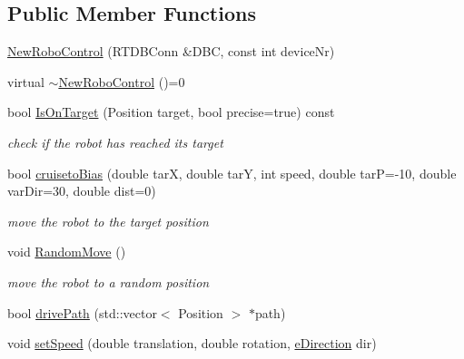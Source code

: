 \begin{DoxyCompactItemize}
RD}, 
\hyperlink{classNewRoboControl_a077fa253b827c190e82c1ce1e4c8d18faa55a679c9e8fbc7400c88ce3cab09c48}{BACKWARD}
 \}
\begin{DoxyCompactList}\small\item\em Enumeration for the driving directions. \item\end{DoxyCompactList}\end{DoxyCompactItemize}
\subsection*{Public Member Functions}
\begin{DoxyCompactItemize}
\item 
\hyperlink{classNewRoboControl_a81f7ad52f88ea8fb90eeff5650efa1c5}{NewRoboControl} (RTDBConn \&DBC, const int deviceNr)
\item 
virtual \hyperlink{classNewRoboControl_ae63cbd6c60d37882d176e9e7d60b11ba}{$\sim$NewRoboControl} ()=0
\item 
bool \hyperlink{classNewRoboControl_a77b0e86bef15f3b1fb6cf98d91c6a9b4}{IsOnTarget} (Position target, bool precise=true) const 
\begin{DoxyCompactList}\small\item\em check if the robot has reached its target \item\end{DoxyCompactList}\item 
bool \hyperlink{classNewRoboControl_a30944b8982d85ab2ee83fd248b731bc0}{cruisetoBias} (double tarX, double tarY, int speed, double tarP=-\/10, double varDir=30, double dist=0)
\begin{DoxyCompactList}\small\item\em move the robot to the target position \item\end{DoxyCompactList}\item 
void \hyperlink{classNewRoboControl_ab3231acd7efd60677b4f48b094cb6dd3}{RandomMove} ()
\begin{DoxyCompactList}\small\item\em move the robot to a random position \item\end{DoxyCompactList}\item 
bool \hyperlink{classNewRoboControl_a9816eae1b7c90dbb74a7e0365e2b57e9}{drivePath} (std::vector$<$ Position $>$ $\ast$path)
\item 
void \hyperlink{classNewRoboControl_ad2ddddb5f0272a733021524ebaaaeffd}{setSpeed} (double translation, double rotation, \hyperlink{classNewRoboControl_a077fa253b827c190e82c1ce1e4c8d18f}{eDirection} dir)
\end{DoxyCompactItemize}
